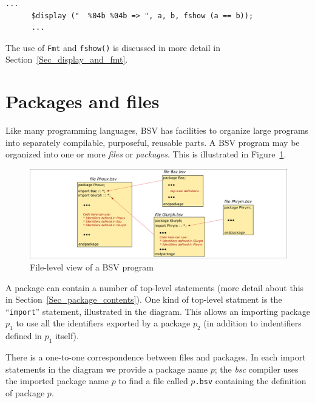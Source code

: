 {\small
\begin{Verbatim}[frame=single]
      ...
      $display ("  %04b %04b => ", a, b, fshow (a == b));
      ...
\end{Verbatim}
}

The use of \verb|Fmt| and \verb|fshow()| is discussed in more detail
in Section~\ref{Sec_display_and_fmt}.


\section{Packages and files}


Like many programming languages, BSV has facilities to organize large
programs into separately compilable, purposeful, reusable parts.  A
BSV program may be organized into one or more \emph{files} or
\emph{packages}.  This is illustrated in
Figure~\ref{Fig_BSV_program_structure}.
\begin{figure}[htbp]
  \centerline{\includegraphics[width=6in,angle=0]{Figures/Fig_BSV_program_structure}}
  \caption{\label{Fig_BSV_program_structure}
           File-level view of a BSV program}
\end{figure}

A package can contain a number of top-level statements (more detail
about this in Section~\ref{Sec_package_contents}).  One kind of
top-level statment is the ``\verb|import|'' statement, illustrated in
the diagram.  This allows an importing package $p_1$ to use all the
identifiers exported by a package $p_2$ (in addition to indentifiers
defined in $p_1$ itself).

There is a one-to-one correspondence between files and packages.  In
each import statements in the diagram we provide a package name $p$;
the \emph{bsc} compiler uses the imported package name $p$ to find a
file called $p$\verb|.bsv| containing the definition of package $p$.

